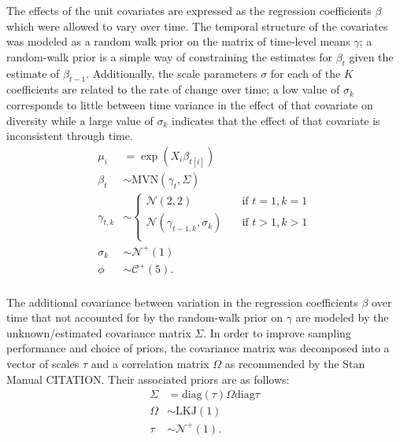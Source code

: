 \documentclass[12pt,letterpaper]{article}
\begin{document}
The effects of the unit covariates are expressed as the regression coefficients \(\beta\) which were allowed to vary over time. The temporal structure of the covariates was modeled as a random walk prior on the matrix of time-level means \(\gamma\); a random-walk prior is a simple way of constraining the estimates for \(\beta_{t}\) given the estimate of \(\beta_{t - 1}\). Additionally, the scale parameters \(\sigma\) for each of the \(K\) coefficients are related to the rate of change over time; a low value of \(\sigma_{k}\) corresponds to little between time variance in the effect of that covariate on diversity while a large value of \(\sigma_{k}\) indicates that the effect of that covariate is inconsistent through time.
\begin{equation}
  \begin{aligned}
    \mu_{i} &= \exp(X_{i} \beta_{t[i]}) \\
    \beta_{t} &\sim \text{MVN}(\gamma_{t}, \Sigma) \\
    \gamma_{t, k} &\sim 
      \begin{cases}
        \mathcal{N}(2, 2) & \quad \text{if } t = 1, k = 1 \\
        \mathcal{N}(\gamma_{t - 1, k}, \sigma_{k}) & \quad \text{if } t > 1, k > 1 \\
      \end{cases} \\
    \sigma_{k} &\sim \mathcal{N}^{+}(1) \\ 
    \phi &\sim \mathcal{C}^{+}(5). \\
  \end{aligned}
\end{equation}

The additional covariance between variation in the regression coefficients \(\beta\) over time that not accounted for by the random-walk prior on \(\gamma\) are modeled by the unknown/estimated covariance matrix \(\Sigma\). In order to improve sampling performance and choice of priors, the covariance matrix was decomposed into a vector of scales \(\tau\) and a correlation matrix \(\Omega\) as recommended by the Stan Manual CITATION. Their associated priors are as follows:
\begin{equation}
  \begin{aligned}
    \Sigma &= \text{diag}(\tau) \Omega \text{diag}{\tau} \\
    \Omega &\sim \text{LKJ}(1) \\
    \tau &\sim \mathcal{N}^{+}(1). \\
  \end{aligned}
\end{equation}
\end{document}
